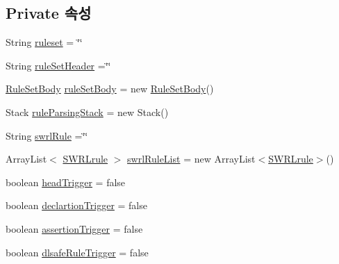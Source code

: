 \subsection*{Private 속성}
\begin{DoxyCompactItemize}
\item 
String \mbox{\hyperlink{classcom_1_1github_1_1aites_1_1framework_1_1ruleset_1_1_rule_set_parser_a3426342e8e47a6a3e2a7588707908266}{ruleset}} = \char`\"{}\char`\"{}
\item 
String \mbox{\hyperlink{classcom_1_1github_1_1aites_1_1framework_1_1ruleset_1_1_rule_set_parser_a3f43d28f08d4975f3cd5b549f827b2fc}{rule\+Set\+Header}} =\char`\"{}\char`\"{}
\item 
\mbox{\hyperlink{classcom_1_1github_1_1aites_1_1framework_1_1ruleset_1_1_rule_set_body}{Rule\+Set\+Body}} \mbox{\hyperlink{classcom_1_1github_1_1aites_1_1framework_1_1ruleset_1_1_rule_set_parser_a26a2051c6d48ee98ff74210025bb8c36}{rule\+Set\+Body}} = new \mbox{\hyperlink{classcom_1_1github_1_1aites_1_1framework_1_1ruleset_1_1_rule_set_body}{Rule\+Set\+Body}}()
\item 
Stack \mbox{\hyperlink{classcom_1_1github_1_1aites_1_1framework_1_1ruleset_1_1_rule_set_parser_ad92f9c3c2b209a76828c8ad6cf42e365}{rule\+Parsing\+Stack}} = new Stack()
\item 
String \mbox{\hyperlink{classcom_1_1github_1_1aites_1_1framework_1_1ruleset_1_1_rule_set_parser_a81953d2a2deaddd2d73e34af469159f1}{swrl\+Rule}} =\char`\"{}\char`\"{}
\item 
Array\+List$<$ \mbox{\hyperlink{classcom_1_1github_1_1aites_1_1framework_1_1rule_1_1_s_w_r_lrule}{S\+W\+R\+Lrule}} $>$ \mbox{\hyperlink{classcom_1_1github_1_1aites_1_1framework_1_1ruleset_1_1_rule_set_parser_a6896629560a67b1edaa7fc03d33ed350}{swrl\+Rule\+List}} = new Array\+List$<$\mbox{\hyperlink{classcom_1_1github_1_1aites_1_1framework_1_1rule_1_1_s_w_r_lrule}{S\+W\+R\+Lrule}}$>$()
\item 
boolean \mbox{\hyperlink{classcom_1_1github_1_1aites_1_1framework_1_1ruleset_1_1_rule_set_parser_a70252e8eb713eeeda03c7a73e9c9facd}{head\+Trigger}} = false
\item 
boolean \mbox{\hyperlink{classcom_1_1github_1_1aites_1_1framework_1_1ruleset_1_1_rule_set_parser_ae680f239df4e9c43cd038fdd05ee3d9c}{declartion\+Trigger}} = false
\item 
boolean \mbox{\hyperlink{classcom_1_1github_1_1aites_1_1framework_1_1ruleset_1_1_rule_set_parser_ac68e866241401e27a2527c388097ca88}{assertion\+Trigger}} = false
\item 
boolean \mbox{\hyperlink{classcom_1_1github_1_1aites_1_1framework_1_1ruleset_1_1_rule_set_parser_ae93289fb2f5e1b3190b5ced3c760eb95}{dlsafe\+Rule\+Trigger}} = false
\end{DoxyCompactItemize}


